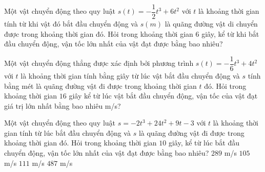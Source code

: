 \begin{bt}%
	Một vật chuyển động theo quy luật $s(t)=-\dfrac{1}{2}t^3+6t^2$  với $t$ là khoảng thời gian tính từ khi vật đó bắt đầu chuyển động và $s(m)$ là quãng đường vật di chuyển được trong khoảng thời gian đó. Hỏi trong khoảng thời gian $6$ giây, kể từ khi bắt đầu chuyển động, vận tốc lớn nhất của vật đạt được bằng bao nhiêu?
\end{bt}

\begin{bt}%
	Một vật chuyển động thẳng được xác định bởi phương trình $s(t)=-\dfrac{1}{6}  t^3+4 t^2$ với $t$ là khoảng thời gian tính bằng giây từ lúc vật bắt đầu chuyển động và $s$ tính bằng mét là quãng đường vật đi được trong khoảng thời gian $t$ đó. Hỏi trong khoảng thời gian $16$ giây kể từ lúc vật bắt đầu chuyển động, vận tốc của vật đạt giá trị lớn nhất bằng bao nhiêu m/s?
\end{bt}

\begin{ex}%
	Một vật chuyển động theo quy luật $s = -2t^3 + 24t^2 + 9t - 3$ với $t$ là khoảng thời gian tính từ lúc bắt đầu chuyển động và $s$ là quãng đường vật đi được trong khoảng thời gian đó. Hỏi trong khoảng thời gian $10$ giây, kể  từ lúc bắt đầu chuyển động, vận tốc lớn nhất của vật đạt được bằng bao nhiêu?
	 \choice
		{$289$ m/s} 
		 {\True $105$ m/s}
		 {$111$ m/s}
		{$487$ m/s} 
\end{ex}

